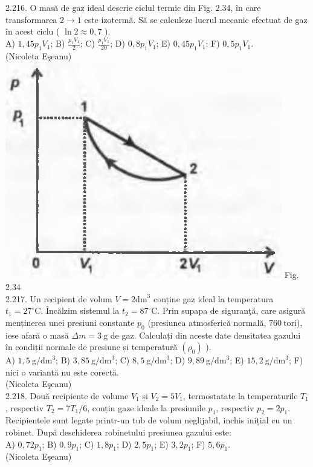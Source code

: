 \documentclass[10pt]{article}
\begin{document}
2.216. O masă de gaz ideal descrie ciclul termic din Fig. 2.34, în care transformarea $2 \rightarrow 1$ este izotermă. Să se calculeze lucrul mecanic efectuat de gaz în acest ciclu ( $\ln 2 \approx 0,7$ ).\\ A) $1,45 p_{1} V_{1}$; B) $\frac{p_{1} V_{1}}{2}$; C) $\frac{p_{1} V_{1}}{20}$; D) $0,8 p_{1} V_{1}$; E) $0,45 p_{1} V_{1}$; F) $0,5 p_{1} V_{1}$.\\ (Nicoleta Eşeanu)\\ \includegraphics[max width=\textwidth, center]{2025_07_01_5b3ff9fa0d508c8e9f17g-122(1)} Fig. 2.34\\

2.217. Un recipient de volum $V=2 \mathrm{dm}^{3}$ conține gaz ideal la temperatura $t_{1}=27^{\circ} \mathrm{C}$. Încălzim sistemul la $t_{2}=87^{\circ} \mathrm{C}$. Prin supapa de siguranţă, care asigură menținerea unei presiuni constante $p_{0}$ (presiunea atmosferică normală, $760 \mathrm{~tori}$), iese afară o masă $\Delta m=3 \mathrm{~g}$ de gaz. Calculați din aceste date densitatea gazului în condiții normale de presiune și temperatură $\left(\rho_{0}\right)$ ).\\ A) $1,5 \mathrm{~g} / \mathrm{dm}^{3}$; B) $3,85 \mathrm{~g} / \mathrm{dm}^{3}$; C) $8,5 \mathrm{~g} / \mathrm{dm}^{3}$; D) $9,89 \mathrm{~g} / \mathrm{dm}^{3}$; E) $15,2 \mathrm{~g} / \mathrm{dm}^{3}$; F) nici o variantă nu este corectă.\\ (Nicoleta Eşeanu)\\

2.218. Două recipiente de volume $V_{1}$ și $V_{2}=5 V_{1}$, termostatate la temperaturile $T_{1}$, respectiv $T_{2}=7 T_{1} / 6$, conțin gaze ideale la presiunile $p_{1}$, respectiv $p_{2}=2 p_{1}$. Recipientele sunt legate printr-un tub de volum neglijabil, inchis inițial cu un robinet. După deschiderea robinetului presiunea gazului este:\\ A) $0,72 p_{1}$; B) $0,9 p_{1}$; C) $1,8 p_{1}$; D) $2,5 p_{1}$; E) $3,2 p_{1}$; F) $5,6 p_{1}$.\\ (Nicoleta Eşeanu)\\
\end{document}
